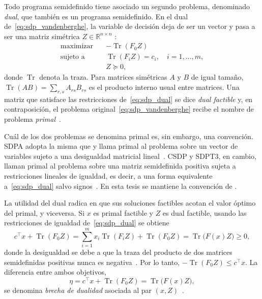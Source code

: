Todo programa semidefinido tiene asociado un segundo problema, denominado \textit{dual}, que
también es un programa semidefinido. En el dual de~\eqref{eq:sdp_vandenberghe}, la variable de
decisión deja de ser un vector y pasa a ser una matriz simétrica $Z \in \mathbb{R}^{n \times n}$
\parencite[p.~63]{vandenbergheSemidefiniteProgramming1996}:
\begin{equation}
    \label{eq:sdp_dual}
    \begin{aligned}
        \text{maximizar}   \quad & {-\operatorname{Tr}(F_0 Z)} \\
        \text{sujeto a}    \quad & \operatorname{Tr}(F_i Z) = c_i, \quad i = 1, \ldots, m, \\
                                 & Z \succeq 0,
    \end{aligned}
\end{equation}
donde $\operatorname{Tr}$ denota la traza. Para matrices simétricas $A$ y $B$ de igual tamaño,
$\operatorname{Tr}(AB) = \sum_{r,s} A_{rs} B_{rs}$ es el producto interno usual entre matrices.
Una matriz que satisface las
restricciones de~\eqref{eq:sdp_dual} se dice \textit{dual factible} y, en contraposición, el
problema original~\eqref{eq:sdp_vandenberghe} recibe el nombre de problema
\textit{primal}~\parencite[p.~63]{vandenbergheSemidefiniteProgramming1996}.

Cuál de los dos problemas se denomina primal es, sin embargo, una convención. SDPA adopta la misma
que \textcite{vandenbergheSemidefiniteProgramming1996} y llama primal al problema sobre un vector
de variables sujeto a una desigualdad matricial
lineal~\parencite[p.~3]{fujisawaHighperformanceSoftwarePackage2010}. CSDP y SDPT3, en cambio,
llaman primal al problema sobre una matriz semidefinida positiva sujeta a restricciones lineales
de igualdad, es decir, a una forma equivalente a~\eqref{eq:sdp_dual} salvo
signos~\parencite{borchersCSDPLibrarySemidefinite1999,tohImplementationUsageSDPT32012a}. En esta tesis se mantiene
la convención de \textcite{vandenbergheSemidefiniteProgramming1996}.

La utilidad del dual radica en que sus soluciones factibles acotan el valor óptimo del primal, y
viceversa. Si $x$ es primal factible y $Z$ es dual factible, usando las restricciones de
igualdad de~\eqref{eq:sdp_dual} se obtiene
\begin{equation}
    \label{eq:sdp_brecha}
    c^\top x + \operatorname{Tr}(F_0 Z)
    = \sum_{i=1}^{m} x_i \operatorname{Tr}(F_i Z) + \operatorname{Tr}(F_0 Z)
    = \operatorname{Tr}\bigl(F(x) Z\bigr) \geq 0,
\end{equation}
donde la desigualdad se debe a que la traza del producto de dos matrices semidefinidas positivas
nunca es negativa~\parencite[p.~64]{vandenbergheSemidefiniteProgramming1996}. Por lo tanto,
$-\operatorname{Tr}(F_0 Z) \leq c^\top x$. La diferencia entre ambos objetivos,
\[
    \eta = c^\top x + \operatorname{Tr}(F_0 Z) = \operatorname{Tr}\bigl(F(x) Z\bigr),
\]
se denomina \textit{brecha de dualidad} asociada al par
$(x, Z)$~\parencite[p.~64]{vandenbergheSemidefiniteProgramming1996}.

